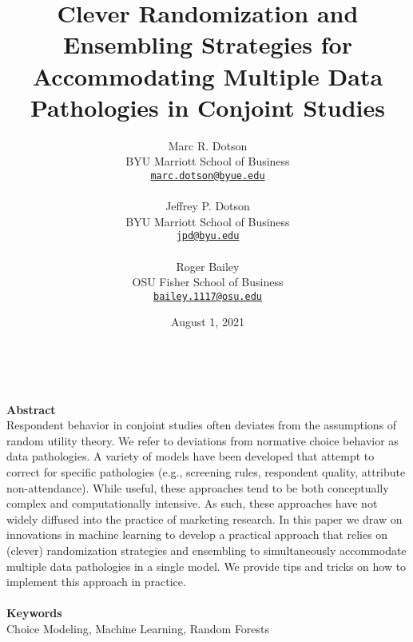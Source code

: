 \documentclass[12pt,titlepage]{mktg-article}
\begin{document}
\title{Clever Randomization and Ensembling Strategies for Accommodating Multiple Data Pathologies in Conjoint Studies}
\author{
    Marc R. Dotson\\
  BYU Marriott School of Business\\
  \href{mailto:marc.dotson@byue.edu}{\nolinkurl{marc.dotson@byue.edu}}\\
   \\   Jeffrey P. Dotson\\
  BYU Marriott School of Business\\
  \href{mailto:jpd@byu.edu}{\nolinkurl{jpd@byu.edu}}\\
   \\   Roger Bailey\\
  OSU Fisher School of Business\\
  \href{mailto:bailey.1117@osu.edu}{\nolinkurl{bailey.1117@osu.edu}}\\
  }
\date{August 1, 2021}

\maketitle
\doublespacing

\begin{center}
{}\\
\end{center}
\vspace{4mm}
\textbf{Abstract}\\
Respondent behavior in conjoint studies often deviates from the assumptions of random utility theory. We refer to deviations from normative choice behavior as data pathologies. A variety of models have been developed that attempt to correct for specific pathologies (e.g., screening rules, respondent quality, attribute non-attendance). While useful, these approaches tend to be both conceptually complex and computationally intensive. As such, these approaches have not widely diffused into the practice of marketing research. In this paper we draw on innovations in machine learning to develop a practical approach that relies on (clever) randomization strategies and ensembling to simultaneously accommodate multiple data pathologies in a single model. We provide tips and tricks on how to implement this approach in practice.
\\ \\
\noindent \textbf{Keywords}\\ 
Choice Modeling, Machine Learning, Random Forests
\end{document}
